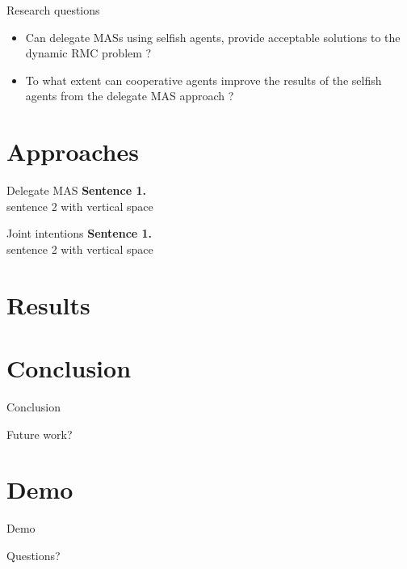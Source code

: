 \documentclass[dvipsnames,handout]{beamer}
\begin{document}
\begin{frame}{Research questions}
\begin{itemize}
  \item Can delegate MASs using selfish agents, provide acceptable solutions to
  the dynamic RMC problem ?
  \item To what extent can cooperative agents improve the results of the
  selfish agents from the delegate MAS approach ?
\end{itemize}
\end{frame}

\section{Approaches}

\begin{frame}{Delegate MAS}
\textbf{Sentence 1.} \\ 
\vspace{\baselineskip}
sentence 2 with vertical space
\end{frame}

\begin{frame}{Joint intentions}
\textbf{Sentence 1.} \\ 
\vspace{\baselineskip}
sentence 2 with vertical space
\end{frame}

\section{Results}


\section{Conclusion}

\begin{frame}{Conclusion}

\end{frame}

\begin{frame}{Future work?}

\end{frame}

\section{Demo}

\begin{frame}
\begin{center} 
\Huge Demo
\end{center} 
\end{frame}

\begin{frame}
\begin{center} 
\Huge Questions? 
\end{center} 
\end{frame}
\end{document}

